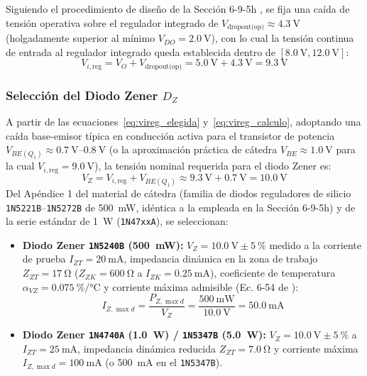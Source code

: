Siguiendo el procedimiento de diseño de la Sección 6-9-5h \cite{gonzalez_p3}, se fija una caída de tensión operativa sobre el regulador integrado de $V_{\text{dropout(op)}} \approx \SI{4,3}{\volt}$ (holgadamente superior al mínimo $V_{DO} = \SI{2,0}{\volt}$), con lo cual la tensión continua de entrada al regulador integrado queda establecida dentro de $[\SI{8,0}{\volt}, \SI{12,0}{\volt}]$:
\begin{equation}
    V_{i,\text{reg}} = V_O + V_{\text{dropout(op)}} = \SI{5,0}{\volt} + \SI{4,3}{\volt} = \SI{9,3}{\volt}
    \label{eq:vireg_calculo}
\end{equation}

\subsubsection{Selección del Diodo Zener $D_Z$}
A partir de las ecuaciones~\eqref{eq:vireg_elegida} y~\eqref{eq:vireg_calculo}, adoptando una caída base-emisor típica en conducción activa para el transistor de potencia $V_{BE(Q_1)} \approx \SI{0,7}{\volt}\text{--}\SI{0,8}{\volt}$ (o la aproximación práctica de cátedra $V_{BE} \approx \SI{1,0}{\volt}$ para la cual $V_{i,\text{reg}} = \SI{9,0}{\volt}$), la tensión nominal requerida para el diodo Zener es:
\begin{equation}
    V_Z = V_{i,\text{reg}} + V_{BE(Q_1)} \approx \SI{9,3}{\volt} + \SI{0,7}{\volt} = \SI{10,0}{\volt}
    \label{eq:vz_calculo}
\end{equation}
Del Apéndice 1 del material de cátedra \cite{gonzalez_p2} (familia de diodos reguladores de silicio \texttt{1N5221B}--\texttt{1N5272B} de \SI{500}{\milli\watt}, idéntica a la empleada en la Sección 6-9-5h) y de la serie estándar de \SI{1}{\watt} (\texttt{1N47xxA}), se seleccionan:
\begin{itemize}
    \item \textbf{Diodo Zener \texttt{1N5240B} (\SI{500}{\milli\watt}):} $V_Z = \SI{10,0}{\volt} \pm \SI{5}{\percent}$ medido a la corriente de prueba $I_{ZT} = \SI{20}{\milli\ampere}$, impedancia dinámica en la zona de trabajo $Z_{ZT} = \SI{17}{\ohm}$ ($Z_{ZK} = \SI{600}{\ohm}$ a $I_{ZK} = \SI{0,25}{\milli\ampere}$), coeficiente de temperatura $\alpha_{VZ} = \SI{+0,075}{\percent\per\celsius}$ y corriente máxima admisible (Ec. 6-54 de \cite{gonzalez_p2}):
    \begin{equation}
        I_{Z,\max d} = \frac{P_{Z,\max d}}{V_Z} = \frac{\SI{500}{\milli\watt}}{\SI{10,0}{\volt}} = \SI{50,0}{\milli\ampere}
        \label{eq:izmax_5240}
    \end{equation}
    \item \textbf{Diodo Zener \texttt{1N4740A} (\SI{1,0}{\watt}) / \texttt{1N5347B} (\SI{5,0}{\watt}):} $V_Z = \SI{10,0}{\volt} \pm \SI{5}{\percent}$ a $I_{ZT} = \SI{25}{\milli\ampere}$, impedancia dinámica reducida $Z_{ZT} = \SI{7,0}{\ohm}$ y corriente máxima $I_{Z,\max d} = \SI{100}{\milli\ampere}$ (o \SI{500}{\milli\ampere} en el \texttt{1N5347B}).
\end{itemize}

